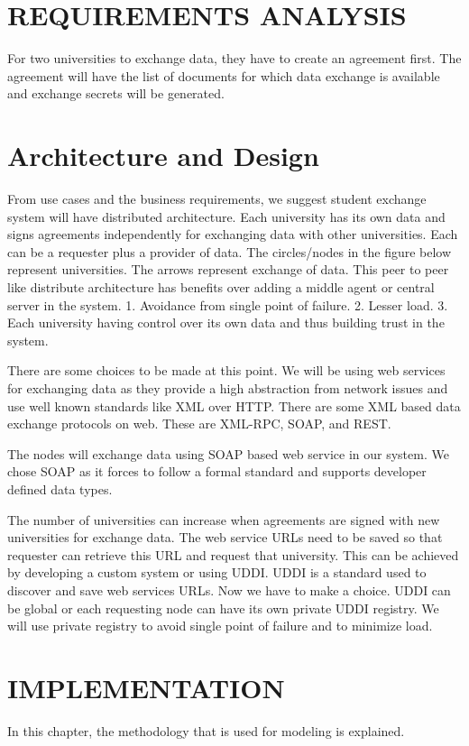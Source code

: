\documentclass[12pt,a4paper,oneside]{book} %
\begin{document}
\chapter{REQUIREMENTS ANALYSIS}\label{c-requirements-analysis}
For two universities to exchange data, they have to create an agreement first. The agreement will have the list of documents for which data exchange is available and exchange secrets will be generated.

\chapter{Architecture and Design}\label{c-architecture-design}
From use cases and the business requirements, we suggest student exchange system will have distributed architecture. Each university has its own data and signs agreements independently for exchanging data with other universities. Each can be a requester plus a provider of data. The circles/nodes in the figure below represent universities. The arrows represent exchange of data.
This peer to peer like distribute architecture has benefits over adding a middle agent or central server in the system.
1.	Avoidance from single point of failure.
2.	Lesser load.
3.	Each university having control over its own data and thus building trust in the system.

There are some choices to be made at this point. We will be using web services for exchanging data as they provide a high abstraction from network issues and use well known standards like XML over HTTP. There are some XML based data exchange protocols on web. These are XML-RPC, SOAP, and REST.

The nodes will exchange data using SOAP based web service in our system.  We chose SOAP as it forces to follow a formal standard and supports developer defined data types.

The number of universities can increase when agreements are signed with new universities for exchange data. The web service URLs need to be saved so that requester can retrieve this URL and request that university. This can be achieved by developing a custom system or using UDDI. UDDI is a standard used to discover and save web services URLs. Now we have to make a choice. UDDI can be global or each requesting node can have its own private UDDI registry. We will use private registry to avoid single point of failure and to minimize load.


\chapter{IMPLEMENTATION}\label{c-implement}
In this chapter, the methodology that is used for modeling is explained.
\end{document}
